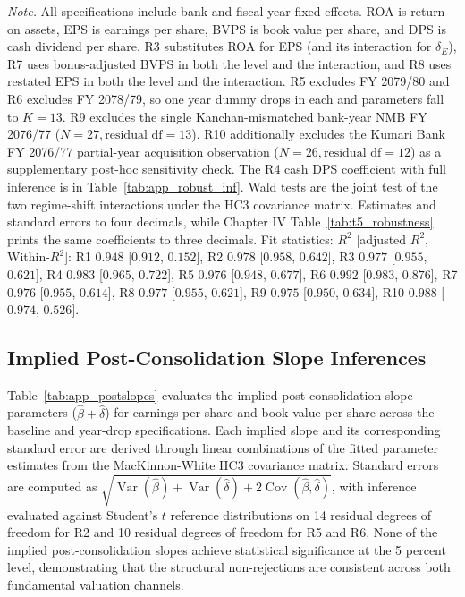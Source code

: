 \begin{table}[!htbp]
\vspace{4pt}
\begin{minipage}{\linewidth}
\footnotesize
\textit{Note.} All specifications include bank and fiscal-year fixed effects. ROA is return on assets, EPS is earnings per share, BVPS is book value per share, and DPS is cash dividend per share. R3 substitutes ROA for EPS (and its interaction for $\delta_E$), R7 uses bonus-adjusted BVPS in both the level and the interaction, and R8 uses restated EPS in both the level and the interaction. R5 excludes FY 2079/80 and R6 excludes FY 2078/79, so one year dummy drops in each and parameters fall to $K = 13$. R9 excludes the single Kanchan-mismatched bank-year NMB FY 2076/77 ($N = 27, \text{residual df} = 13$). R10 additionally excludes the Kumari Bank FY 2076/77 partial-year acquisition observation ($N = 26, \text{residual df} = 12$) as a supplementary post-hoc sensitivity check. The R4 cash DPS coefficient with full inference is in Table~\ref{tab:app_robust_inf}. Wald tests are the joint test of the two regime-shift interactions under the HC3 covariance matrix. Estimates and standard errors to four decimals, while Chapter IV Table~\ref{tab:t5_robustness} prints the same coefficients to three decimals. Fit statistics: $R^2$ [adjusted $R^2$, Within-$R^2$]: R1 $0.948$ [$0.912$, $0.152$], R2 $0.978$ [$0.958$, $0.642$], R3 $0.977$ [$0.955$, $0.621$], R4 $0.983$ [$0.965$, $0.722$], R5 $0.976$ [$0.948$, $0.677$], R6 $0.992$ [$0.983$, $0.876$], R7 $0.976$ [$0.955$, $0.614$], R8 $0.977$ [$0.955$, $0.621$], R9 $0.975$ [$0.950$, $0.634$], R10 $0.988$ [$0.974$, $0.526$].
\end{minipage}
\end{table}

\subsection{Implied Post-Consolidation Slope Inferences}

Table~\ref{tab:app_postslopes} evaluates the implied post-consolidation slope parameters ($\hat{\beta} + \hat{\delta}$) for earnings per share and book value per share across the baseline and year-drop specifications. Each implied slope and its corresponding standard error are derived through linear combinations of the fitted parameter estimates from the MacKinnon-White HC3 covariance matrix. Standard errors are computed as $\sqrt{\operatorname{Var}(\hat{\beta}) + \operatorname{Var}(\hat{\delta}) + 2\operatorname{Cov}(\hat{\beta}, \hat{\delta})}$, with inference evaluated against Student's $t$ reference distributions on 14 residual degrees of freedom for R2 and 10 residual degrees of freedom for R5 and R6. None of the implied post-consolidation slopes achieve statistical significance at the 5 percent level, demonstrating that the structural non-rejections are consistent across both fundamental valuation channels.

